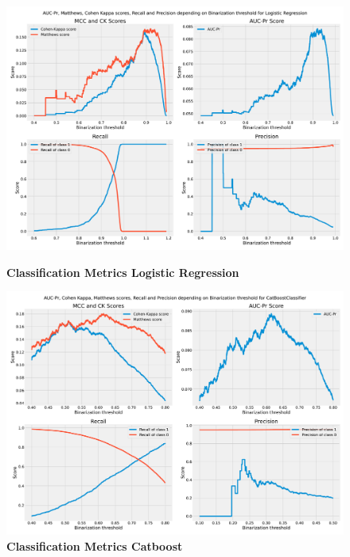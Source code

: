 \begin{figure}[htpb]
	\centering
	\includegraphics[width=1\textwidth]{../imgs/pdf_files/scores_lr.pdf}
	\caption{\textbf{Classification Metrics Logistic Regression}}
	\label{fig:logreg}
	\endminipage
	\hfill
	\centering
	\includegraphics[width=1\textwidth]{../imgs/pdf_files/scores_cbc.pdf}
	\caption{\textbf{Classification Metrics Catboost}}
	\label{fig:cbc}
	\endminipage
\end{figure}

